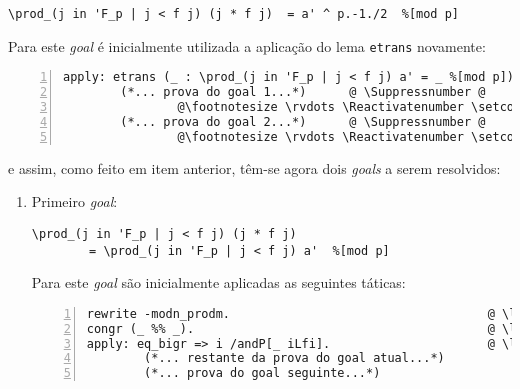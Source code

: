 \begin{enumerate}[label=\textbf{\roman*.}]
\begin{enumerate}[label=\textbf{\roman{enumi}.(\alph*)}]
                        \begin{lstlisting}[language=coq,frame=single,tabsize=1]
\prod_(j in 'F_p | j < f j) (j * f j)  = a' ^ p.-1./2  %[mod p]
                        \end{lstlisting}

                Para este \textit{goal} é inicialmente utilizada a aplicação do lema \lstinline[language=coq]|etrans| novamente:

                        \begin{lstlisting}[language=coq,frame=single, numbers=left,stepnumber=1,tabsize=1, escapechar=@, name=proof]
apply: etrans (_ : \prod_(j in 'F_p | j < f j) a' = _ %[mod p]).        @ \label{line:35-item4b} @    
        (*... prova do goal 1...*)      @ \Suppressnumber @
                @\footnotesize \rvdots \Reactivatenumber \setcounter{lstnumber}{39}@
        (*... prova do goal 2...*)      @ \Suppressnumber @
                @\footnotesize \rvdots \Reactivatenumber \setcounter{lstnumber}{35}@
                        \end{lstlisting}

                e assim, como feito em item anterior, têm-se agora dois \textit{goals} a serem resolvidos:
                
                \begin{enumerate}[label=\textbf{(\alph{enumii}.\arabic*)}]
                        
                        \item Primeiro \textit{goal}:
                
                        \begin{lstlisting}[language=coq,frame=single,tabsize=1]
\prod_(j in 'F_p | j < f j) (j * f j)  
        = \prod_(j in 'F_p | j < f j) a'  %[mod p]
                        \end{lstlisting}

                        Para este \textit{goal} são inicialmente aplicadas as seguintes táticas:
                
                        \begin{lstlisting}[language=coq,frame=single, numbers=left,stepnumber=1,tabsize=1, escapechar=@, name=proof]
rewrite -modn_prodm.                                    @ \label{line:36-item4b-item1} @
congr (_ %% _).                                         @ \label{line:37-item4b-item1} @
apply: eq_bigr => i /andP[_ iLfi].                      @ \label{line:38-item4b-item1} @
        (*... restante da prova do goal atual...*)                        
        (*... prova do goal seguinte...*)                        
                        \end{lstlisting}


\end{enumerate}
\end{enumerate}
\end{enumerate}
